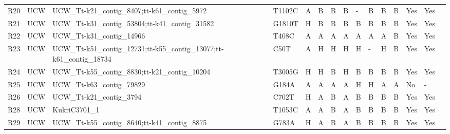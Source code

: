 \begin{sidewaystable}
\begin{localsize}{6}{9}
\begin{tabular}{llllllll!{\extracolsep{4pt}}lllllll}
 R20        & UCW         & UCW\_Tt-k21\_contig\_8407;tt-k61\_contig\_5972                       & T1102C & A      & B         & B        & B        & -            & B         & B         & B     & Yes           & Yes                    &                         \\
 R21        & UCW         & UCW\_Tt-k31\_contig\_53804;tt-k41\_contig\_31582                     & G1810T & H      & B         & B        & B        & B            & B         & B         & B     & Yes           & Yes                    &                         \\
 R22        & UCW         & UCW\_Tt-k31\_contig\_14966                                         & T408C  & A      & A         & A        & A        & A            & A         & A         & B     & Yes           & Yes                    &                         \\
 R23        & UCW         & UCW\_Tt-k51\_contig\_12731;tt-k55\_contig\_13077;tt-k61\_contig\_18734 & C50T   & A      & H         & H        & H        & H            & -         & H         & B     & Yes           & Yes                    &                         \\
 R24        & UCW         & UCW\_Tt-k55\_contig\_8830;tt-k21\_contig\_10204                      & T3005G & H      & H         & B        & H        & B            & B         & B         & B     & Yes           & Yes                    &                         \\
 R25        & UCW         & UCW\_Tt-k63\_contig\_79829                                         & G184A  & A      & A         & A        & A        & H            & H         & A         & A     & No            & -                      &                         \\
 R26        & UCW         & UCW\_Tt-k21\_contig\_3794                                          & C702T  & H      & A         & B        & A        & B            & B         & B         & B     & Yes           & Yes                    &                         \\
 R28        & UCW         & KukriC3701\_1                                                    & T1053C & A      & A         & B        & A        & B            & B         & B         & B     & Yes           & Yes                    &                         \\
 R29        & UCW         & UCW\_Tt-k55\_contig\_8640;tt-k41\_contig\_8875                       & G783A  & H      & A         & B        & A        & B            & B         & B         & B     & Yes           & Yes                    &                         \\

\end{tabular}
\end{localsize}
\end{sidewaystable}
